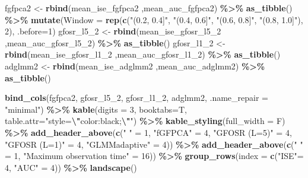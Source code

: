 \documentclass[
]{article}
\newenvironment{Shaded}{\begin{snugshade}}{\end{snugshade}}
\newcommand{\AttributeTok}[1]{\textcolor[rgb]{0.13,0.29,0.53}{#1}}
\newcommand{\DecValTok}[1]{\textcolor[rgb]{0.00,0.00,0.81}{#1}}
\newcommand{\FunctionTok}[1]{\textcolor[rgb]{0.13,0.29,0.53}{\textbf{#1}}}
\newcommand{\NormalTok}[1]{#1}
\newcommand{\OtherTok}[1]{\textcolor[rgb]{0.56,0.35,0.01}{#1}}
\newcommand{\SpecialCharTok}[1]{\textcolor[rgb]{0.81,0.36,0.00}{\textbf{#1}}}
\newcommand{\StringTok}[1]{\textcolor[rgb]{0.31,0.60,0.02}{#1}}
\begin{document}
\begin{Shaded}
\begin{Highlighting}[]
\NormalTok{fgfpca2 }\OtherTok{\textless{}{-}} \FunctionTok{rbind}\NormalTok{(mean\_ise\_fgfpca2 ,mean\_auc\_fgfpca2) }\SpecialCharTok{\%\textgreater{}\%} \FunctionTok{as\_tibble}\NormalTok{() }\SpecialCharTok{\%\textgreater{}\%}
  \FunctionTok{mutate}\NormalTok{(}\AttributeTok{Window =} \FunctionTok{rep}\NormalTok{(}\FunctionTok{c}\NormalTok{(}\StringTok{"(0.2, 0.4]"}\NormalTok{, }\StringTok{"(0.4, 0.6]"}\NormalTok{, }\StringTok{"(0.6, 0.8]"}\NormalTok{, }\StringTok{"(0.8, 1.0]"}\NormalTok{), }\DecValTok{2}\NormalTok{), }\AttributeTok{.before=}\DecValTok{1}\NormalTok{)}
\NormalTok{gfosr\_l5\_2 }\OtherTok{\textless{}{-}} \FunctionTok{rbind}\NormalTok{(mean\_ise\_gfosr\_l5\_2 ,mean\_auc\_gfosr\_l5\_2) }\SpecialCharTok{\%\textgreater{}\%} \FunctionTok{as\_tibble}\NormalTok{()}
\NormalTok{gfosr\_l1\_2 }\OtherTok{\textless{}{-}} \FunctionTok{rbind}\NormalTok{(mean\_ise\_gfosr\_l1\_2 ,mean\_auc\_gfosr\_l1\_2) }\SpecialCharTok{\%\textgreater{}\%} \FunctionTok{as\_tibble}\NormalTok{()}
\NormalTok{adglmm2 }\OtherTok{\textless{}{-}} \FunctionTok{rbind}\NormalTok{(mean\_ise\_adglmm2 ,mean\_auc\_adglmm2) }\SpecialCharTok{\%\textgreater{}\%} \FunctionTok{as\_tibble}\NormalTok{() }

\FunctionTok{bind\_cols}\NormalTok{(fgfpca2, gfosr\_l5\_2, gfosr\_l1\_2, adglmm2, }\AttributeTok{.name\_repair =} \StringTok{"minimal"}\NormalTok{) }\SpecialCharTok{\%\textgreater{}\%}
  \FunctionTok{kable}\NormalTok{(}\AttributeTok{digits =} \DecValTok{3}\NormalTok{, }\AttributeTok{booktabs=}\NormalTok{T,}
        \AttributeTok{table.attr=}\StringTok{"style=}\SpecialCharTok{\textbackslash{}"}\StringTok{color:black;}\SpecialCharTok{\textbackslash{}"}\StringTok{"}\NormalTok{) }\SpecialCharTok{\%\textgreater{}\%}
  \FunctionTok{kable\_styling}\NormalTok{(}\AttributeTok{full\_width =}\NormalTok{ F) }\SpecialCharTok{\%\textgreater{}\%} 
  \FunctionTok{add\_header\_above}\NormalTok{(}\FunctionTok{c}\NormalTok{(}\StringTok{" "} \OtherTok{=} \DecValTok{1}\NormalTok{, }\StringTok{"fGFPCA"} \OtherTok{=} \DecValTok{4}\NormalTok{, }\StringTok{"GFOSR (L=5)"} \OtherTok{=} \DecValTok{4}\NormalTok{, }
                     \StringTok{"GFOSR (L=1)"} \OtherTok{=} \DecValTok{4}\NormalTok{, }\StringTok{"GLMMadaptive"} \OtherTok{=} \DecValTok{4}\NormalTok{)) }\SpecialCharTok{\%\textgreater{}\%}
  \FunctionTok{add\_header\_above}\NormalTok{(}\FunctionTok{c}\NormalTok{(}\StringTok{" "} \OtherTok{=} \DecValTok{1}\NormalTok{, }\StringTok{"Maximum observation time"} \OtherTok{=} \DecValTok{16}\NormalTok{)) }\SpecialCharTok{\%\textgreater{}\%}
  \FunctionTok{group\_rows}\NormalTok{(}\AttributeTok{index =} \FunctionTok{c}\NormalTok{(}\StringTok{"ISE"}\OtherTok{=} \DecValTok{4}\NormalTok{, }\StringTok{"AUC"} \OtherTok{=} \DecValTok{4}\NormalTok{)) }\SpecialCharTok{\%\textgreater{}\%}
  \FunctionTok{landscape}\NormalTok{()}
\end{Highlighting}
\end{Shaded}
\end{document}
